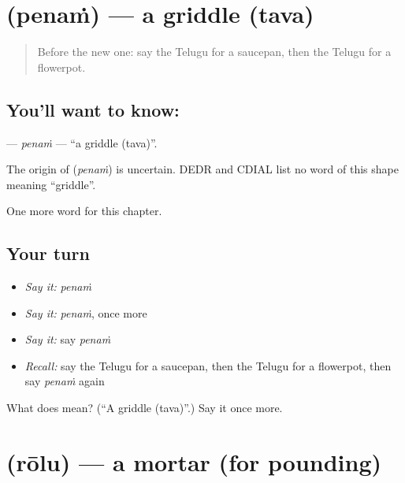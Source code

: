 \section[\texorpdfstring{\te{పెనం} (penaṁ)}{పెనం (penaṁ)}]{ (penaṁ) — a griddle (tava)}

\label{lesson:TE-C270-penam}



\begin{quote}
Before the new one: say the Telugu for a saucepan, then the Telugu for a flowerpot.
\end{quote}

\subsection*{You'll want to know: }
\textbf{} — \emph{penaṁ} — \textquotedblleft{}a griddle (tava)\textquotedblright{}.

\begin{cousinweb}
The origin of \textbf{} (\emph{penaṁ}) is uncertain. DEDR and CDIAL list no word of this shape meaning \textquotedblleft{}griddle\textquotedblright{}.
\end{cousinweb}

\begin{grammarlens}[title={What you've built}]
One more word for this chapter.
\end{grammarlens}

\subsection*{Your turn}
\begin{itemize}
\raggedright
  \item \emph{Say it:} \emph{penaṁ}
  \item \emph{Say it:} \emph{penaṁ}, once more
  \item \emph{Say it:} say \emph{penaṁ}
  \item \emph{Recall:} say the Telugu for a saucepan, then the Telugu for a flowerpot, then say \emph{penaṁ} again
\end{itemize}

\begin{tcolorbox}[breakable,colback=teal!4,colframe=teal!35!black,title={Before you move on}]
What does  mean? (\textquotedblleft{}A griddle (tava)\textquotedblright{}.) Say it once more.
\end{tcolorbox}
\section[\texorpdfstring{\te{రోలు} (rōlu)}{రోలు (rōlu)}]{ (rōlu) — a mortar (for pounding)}

